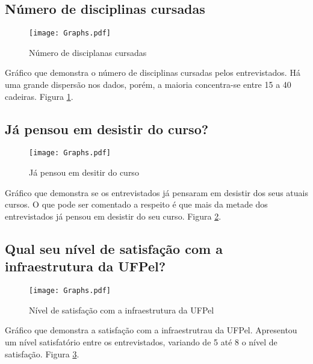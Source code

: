 \documentclass[11pt]{scrartcl} %
\begin{document}
\clearpage

\subsection{Número de disciplinas cursadas}

\begin{figure}[h]
  \centering
  \texttt{[image: Graphs.pdf]}
  \label{fig:graph7}
  \caption{Número de disciplanas cursadas}
\end{figure}

Gráfico que demonstra o número de disciplinas cursadas pelos entrevistados. Há uma grande dispersão nos dados, porém, a maioria concentra-se entre 15 a 40 cadeiras. Figura \ref{fig:graph7}.

\clearpage

\subsection{Já pensou em desistir do curso?}

\begin{figure}[h]
  \centering
  \texttt{[image: Graphs.pdf]}
  \label{fig:graph8}
  \caption{Já pensou em desitir do curso}
\end{figure}

Gráfico que demonstra se os entrevistados já pensaram em desistir dos seus atuais cursos. O que pode ser comentado a respeito é que mais da metade dos entrevistados já pensou em desistir do seu curso. Figura \ref{fig:graph8}.

\clearpage

\subsection{Qual seu nível de satisfação com a infraestrutura da UFPel?}

\begin{figure}[h]
  \centering
  \texttt{[image: Graphs.pdf]}
  \label{fig:graph9}
  \caption{Nível de satisfação com a infraestrutura da UFPel}
\end{figure}

Gráfico que demonstra a satisfação com a infraestrutrau da UFPel. Apresentou um nível satisfatório entre os entrevistados, variando de 5 até 8 o nível de satisfação. Figura \ref{fig:graph9}.

\clearpage

\end{document}
